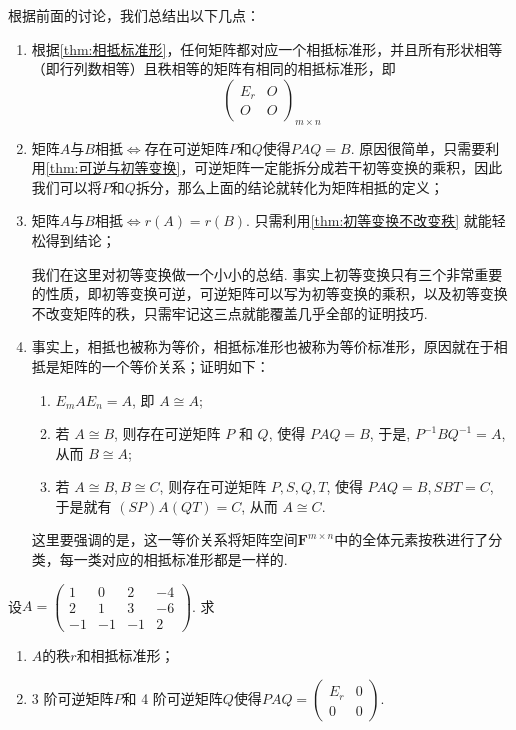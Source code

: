 根据前面的讨论，我们总结出以下几点：
\begin{enumerate}
    \item 根据\autoref{thm:相抵标准形}，任何矩阵都对应一个相抵标准形，并且所有形状相等（即行列数相等）且秩相等的矩阵有相同的相抵标准形，即\[\begin{pmatrix}
                  E_r & O \\ O & O
              \end{pmatrix}_{m\times n}\]

    \item 矩阵$A$与$B$相抵$\iff$存在可逆矩阵$P$和$Q$使得$PAQ=B$. 原因很简单，只需要利用\autoref{thm:可逆与初等变换}，可逆矩阵一定能拆分成若干初等变换的乘积，因此我们可以将$P$和$Q$拆分，那么上面的结论就转化为矩阵相抵的定义；

    \item 矩阵$A$与$B$相抵$\iff r(A)=r(B)$. 只需利用\autoref{thm:初等变换不改变秩} 就能轻松得到结论；

          我们在这里对初等变换做一个小小的总结. 事实上初等变换只有三个非常重要的性质，即初等变换可逆，可逆矩阵可以写为初等变换的乘积，以及初等变换不改变矩阵的秩，只需牢记这三点就能覆盖几乎全部的证明技巧.

    \item 事实上，相抵也被称为等价，相抵标准形也被称为等价标准形，原因就在于相抵是矩阵的一个等价关系；证明如下：
          \begin{enumerate}
              \item $E_m A E_n = A$, 即 $A \cong A$;

              \item 若 $A \cong B$, 则存在可逆矩阵 $P$ 和 $Q$, 使得 $PAQ = B$, 于是, $P^{-1} B Q^{-1} = A$, 从而 $B \cong A$;

              \item 若 $A \cong B, B \cong C$, 则存在可逆矩阵 $P, S, Q, T$, 使得 $PAQ = B, SBT = C$, 于是就有 $(SP)A(QT) = C$, 从而 $A \cong C$.
          \end{enumerate}

          这里要强调的是，这一等价关系将矩阵空间$\mathbf{F}^{m\times n}$中的全体元素按秩进行了分类，每一类对应的相抵标准形都是一样的.
\end{enumerate}

\begin{example}{}{}
    设$A=\begin{pmatrix}
            1 & 0 & 2 & -4 \\ 2 & 1 & 3 & -6 \\ -1 & -1 & -1 & 2
        \end{pmatrix}$. 求
    \begin{enumerate}[label=(\arabic*)]
        \item $A$的秩$r$和相抵标准形；

        \item
              3 阶可逆矩阵$P$和 4 阶可逆矩阵$Q$使得$PAQ=\begin{pmatrix}
                      E_r & 0 \\ 0 & 0
                  \end{pmatrix}$.
    \end{enumerate}
\end{example}

